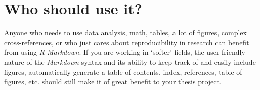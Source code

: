 \documentclass[a4paper, nobind]{templates/ociamthesis}
\newcommand*{\bibtitle}{\textbf{Works Cited}}
\begin{document}
\hypertarget{who-should-use-it}{%
\section*{Who should use it?}\label{who-should-use-it}}

Anyone who needs to use data analysis, math, tables, a lot of figures, complex cross-references, or who just cares about reproducibility in research can benefit from using \emph{R Markdown}.
If you are working in `softer' fields, the user-friendly nature of the \emph{Markdown} syntax and its ability to keep track of and easily include figures, automatically generate a table of contents, index, references, table of figures, etc. should still make it of great benefit to your thesis project.




\setlength{\baselineskip}{0pt} %

{\renewcommand*\MakeUppercase[1]{#1}%
\printbibliography[heading=bibintoc,title={\bibtitle}]}
\end{document}
